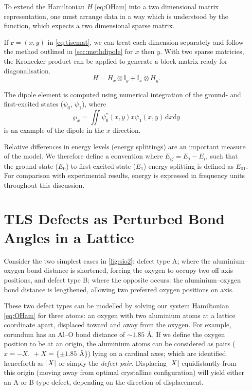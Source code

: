 To extend the Hamiltonian $H$ \cref{eq:OHam} into a two dimensional matrix representation, one must arrange data in a way which is understood by the  function, which expects a two dimensional sparse matrix.

If $\mathbf{r}=(x,y)$ in \cref{eq:tisemat}, we can treat each dimension separately and follow the method outlined in \cref{sec:methdipole} for $x$ then $y$.
With two sparse matricies, the Kronecker product can be applied to generate a block matrix ready for diagonalisation.
\begin{equation}
H = H_x \otimes \mathbb{I}_y + \mathbb{I}_x \otimes H_y.
\label{eq:h2d}
\end{equation}

The dipole element is computed using numerical integration of the ground- and first-excited states ($\psi_0$, $\psi_1$), where
\begin{equation}
    \wp_x = \iint \psi_0^*(x,y) x \psi_1(x,y) \,\mathrm{d}x\mathrm{d}y
    \label{eq:dipole}
\end{equation}
is an example of the dipole in the $x$ direction.

Relative differences in energy levels (\ie energy splittings) are an important measure of the model.
We therefore define a convention where $E_{ij} = E_j-E_i$, such that the ground state ($E_0$) to first excited state ($E_1$) energy splitting is defined as $E_{01}$.
For comparison with experimental results, energy is expressed in frequency units throughout this discussion.

\section[TLSs as Perturbed Bond Angles]{TLS Defects as Perturbed Bond Angles in a Lattice}\label{sec:bonds}

Consider the two simplest cases in \cref{fig:sio2}: defect type A; where the aluminium--oxygen bond distance is shortened, forcing the oxygen to occupy two off axis positions, and defect type B; where the opposite occurs: the aluminium--oxygen bond distance is lengthened, allowing two preferred oxygen positions on axis.

These two defect types can be modelled by solving our system Hamiltonian \cref{eq:OHam} for three atoms: an oxygen with two aluminium atoms at a lattice coordinate apart, displaced toward and away from the oxygen.
For example, corundum has an Al--O bond distance of $\sim\!1.85$ \AA.
If we define the oxygen position to be at an origin, the aluminium atoms can be considered as pairs ($x = -X, \: +X$ = \{$\pm 1.85$ \AA\}) lying on a cardinal axes; which are identified henceforth as $\lvert X\rvert$ or simply the \textit{defect pair}.
Displacing $\lvert X\rvert$ equidistantly from this origin (\ie moving away from optimal crystalline configuration) will yield either an A or B type defect, depending on the direction of displacement.

